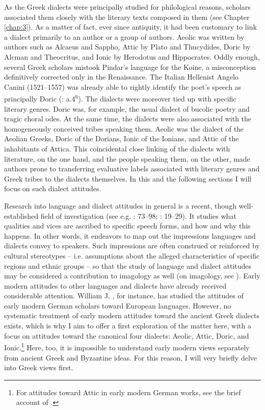 As the Greek dialects were principally studied for philological reasons, scholars associated them closely with the literary texts composed in them (see Chapter \ref{chap:3}). As a matter of fact, ever since antiquity, it had been customary to link a dialect primarily to an author or a group of authors. Aeolic was written by authors such as Alcaeus and Sappho, Attic by Plato and Thucydides, Doric by Alcman and Theocritus, and Ionic by Herodotus and Hippocrates. Oddly enough, several Greek scholars mistook Pindar’s language for the Koine, a misconception definitively corrected only in the Renaissance. The Italian Hellenist Angelo Canini (1521–1557) was already able to rightly identify the poet’s speech as principally Doric (\citealt{Canini1555}: a.4\textsc{\textsuperscript{r}}). The dialects were moreover tied up with specific literary genres. Doric was, for example, the usual dialect of bucolic poetry and tragic choral odes. At the same time, the dialects were also associated with the homogeneously conceived tribes speaking them. Aeolic was the dialect of the Aeolian Greeks, Doric of the Dorians, Ionic of the Ionians, and Attic of the inhabitants of Attica. This coincidental close linking of the dialects with literature, on the one hand, and the people speaking them, on the other, made authors prone to transferring evaluative labels associated with literary genres and Greek tribes to the dialects themselves. In this and the following sections I will focus on such dialect attitudes.

Research into language and dialect attitudes in general is a recent, though well-established field of investigation (see e.g. \citealt{Edwards2009}: 73–98; \citealt{Garrett2010}: 19–29). It studies what qualities and vices are ascribed to specific speech forms, and how and why this happens. In other words, it endeavors to map out the impressions languages and dialects convey to speakers. Such impressions are often construed or reinforced by cultural stereotypes – i.e. assumptions about the alleged characteristics of specific regions and ethnic groups – so that the study of language and dialect attitudes may be considered a contribution to imagology as well (on imagology, see \citealt{BellerLeerssen2007}). Early modern attitudes to other languages and dialects have already received considerable attention. William J. \citet{Jones1999}, for instance, has studied the attitudes of early modern German scholars toward European languages. However, no systematic treatment of early modern attitudes toward the ancient Greek dialects exists, which is why I aim to offer a first exploration of the matter here, with a focus on attitudes toward the canonical four dialects: Aeolic, Attic, Doric, and Ionic.\footnote{For attitudes toward Attic in early modern German works, see the brief account of \citet[251--252]{Roelcke2014}.} Here, too, it is impossible to understand early modern views separately from ancient Greek and Byzantine ideas. For this reason, I will very briefly delve into Greek views first.

